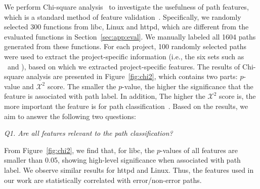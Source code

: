 \documentclass[12pt]{report}	%
\begin{document}
We perform Chi-square analysis~\cite{liu1995chi2} to investigate the usefulness of path features,
which is a standard method of feature validation~\cite{li2018feature}.
%
Specifically, we randomly selected 300 functions from libc, Linux and httpd, 
which are different from the evaluated functions in Section~\ref{sec:app:eval}.
We manually labeled all 1604 paths generated from these functions.
%
For each project, 100 randomly selected paths were used to extract the project-specific information
(i.e., the six sets such as \errsetLastFunc\ and \nerrsetLastFunc),
based on which we extracted project-specific features. 
%
%
The results of Chi-square analysis are presented in Figure~\ref{fig:chi2},
which contains two parts: $p$-value and $\mathcal{X}^2$ score.
The smaller the $p$-value,
the higher the significance that the feature is associated with path label.
In addition,
The higher the $\mathcal{X}^2$ score is, 
the more important the feature is for path classification~\cite{li2018feature}.
%
Based on the results,
we aim to answer the following two questions:

\par\smallskip
\noindent
\textit{Q1. Are all features relevant to the path classification?}
\smallskip

From Figure~\ref{fig:chi2},
we find that, for libc,
%
the $p$-values of all features are smaller than 0.05,
showing high-level significance when associated with path label.
We observe similar results for httpd and Linux.
%
Thus, the features used in our work are statistically correlated with error/non-error paths.
\end{document}
